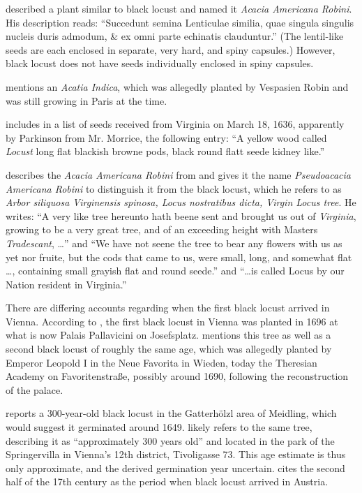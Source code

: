 \citet[pp.~171--173]{cornuti1635robinie} described a plant similar to black locust and named it \emph{Acacia Americana Robini}. His description reads: \enquote{Succedunt semina Lenticulae similia, quae singula singulis nucleis duris admodum, \& ex omni parte echinatis clauduntur.} (The lentil-like seeds are each enclosed in separate, very hard, and spiny capsules.) However, black locust does not have seeds individually enclosed in spiny capsules.

\citet[p.~28]{deLaBrosse1636robinie} mentions an \emph{Acatia Indica}, which was allegedly planted by Vespasien Robin and was still growing in Paris at the time.

\citet[p.~370]{gunther1922botanists} includes in a list of seeds received from Virginia on March 18, 1636, apparently by Parkinson from Mr. Morrice, the following entry: \enquote{A yellow wood called \emph{Locust} long flat blackish browne pods, black round flatt seede kidney like.}

\citet[p.~1550]{parkinson1640theatrumBotanicum} describes the \emph{Acacia Americana Robini} from \citet{cornuti1635robinie} and gives it the name \emph{Pseudoacacia Americana Robini} to distinguish it from the black locust, which he refers to as \emph{Arbor siliquosa Virginensis spinosa, Locus nostratibus dicta, Virgin Locus tree}. He writes: \enquote{A very like tree hereunto hath beene sent and brought us out of \emph{Virginia}, growing to be a very great tree, and of an exceeding height with Masters \emph{Tradescant}, \dots} and \enquote{We have not seene the tree to bear any flowers with us as yet nor fruite, but the cods that came to us, were small, long, and somewhat flat \dots, containing small grayish flat and round seede.} and \enquote{\dots is called Locus by our Nation resident in Virginia.}

There are differing accounts regarding when the first black locust arrived in Vienna. According to \citet[p.~147]{loudon1838arboretum1}, the first black locust in Vienna was planted in 1696 at what is now Palais Pallavicini on Josefsplatz. \citet[pp.~15--16]{jacquin1825univGarten} mentions this tree as well as a second black locust of roughly the same age, which was allegedly planted by Emperor Leopold I in the Neue Favorita in Wieden, today the Theresian Academy on Favoritenstraße, possibly around 1690, following the reconstruction of the palace.

\citet{jagr1949robinie} reports a 300-year-old black locust in the Gatterhölzl area of Meidling, which would suggest it germinated around 1649. \citet{anonymNatLand1949robinie} likely refers to the same tree, describing it as \enquote{approximately 300 years old} and located in the park of the Springervilla in Vienna’s 12th district, Tivoligasse 73. This age estimate is thus only approximate, and the derived germination year uncertain. \citet[p.~1395]{hegi1924band43} cites the second half of the 17th century as the period when black locust arrived in Austria.

